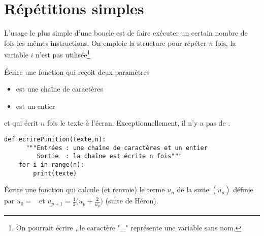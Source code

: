 \section{Répétitions simples}
L'usage le plus simple d'une boucle  est de faire exécuter un certain nombre de fois les mêmes instructions. On emploie la structure  pour répéter $n$ fois, la variable $i$ n'est pas utilisée\footnote{On pourrait écrire , le caractère "\_" représente une variable sans nom.}
\begin{Exercise}[title= La punition]
Écrire une fonction  qui reçoit deux paramètres
\begin{itemize}
\item {} est une chaîne de caractères
\item {} est un entier
\end{itemize}
et qui écrit $n$ fois le texte à l'écran. Exceptionnellement, il n'y a pas de .
\end{Exercise}
\begin{Answer}
\begin{lstlisting}
def ecrirePunition(texte,n):
	  """Entrées : une chaîne de caractères et un entier
	     Sortie  : la chaîne est écrite n fois"""
    for i in range(n):
        print(texte)
\end{lstlisting}
\end{Answer}
\begin{Exercise}[title= Une suite]
Écrire une fonction  qui calcule (et renvoie) le terme $u_n$ de la suite $(u_p)$ définie par $u_0=$\  et $u_{p+1} = \frac 12\bigl(u_p + \frac 2{u_p}\bigr)$ (suite de Héron).
\end{Exercise}
